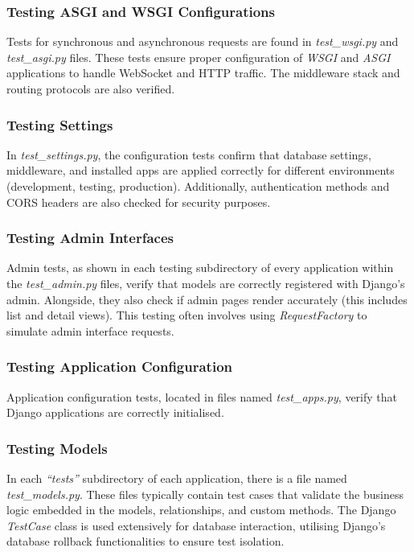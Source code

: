 \subsubsection{Testing ASGI and WSGI Configurations}

Tests for synchronous and asynchronous requests are found in \textit{test\_wsgi.py} and \textit{test\_asgi.py} files. These tests ensure proper configuration of \textit{WSGI} and \textit{ASGI} applications to handle WebSocket and HTTP traffic. The middleware stack and routing protocols are also verified.

\subsubsection{Testing Settings}

In \textit{test\_settings.py}, the configuration tests confirm that database settings, middleware, and installed apps are applied correctly for different environments (development, testing, production). Additionally, authentication methods and CORS headers are also checked for security purposes. 

\subsubsection{Testing Admin Interfaces}

Admin tests, as shown in each testing subdirectory of every application within the \textit{test\_admin.py} files, verify that models are correctly registered with Django's admin. Alongside, they also check if admin pages render accurately (this includes list and detail views). This testing often involves using \textit{RequestFactory} to simulate admin interface requests.

\subsubsection{Testing Application Configuration}

Application configuration tests, located in files named \textit{test\_apps.py}, verify that Django applications are correctly initialised.

\subsubsection{Testing Models}

In each \textit{``tests''} subdirectory of each application, there is a file named \textit{test\_models.py}. These files typically contain test cases that validate the business logic embedded in the models, relationships, and custom methods. The Django \textit{TestCase} class is used extensively for database interaction, utilising Django's database rollback functionalities to ensure test isolation.

